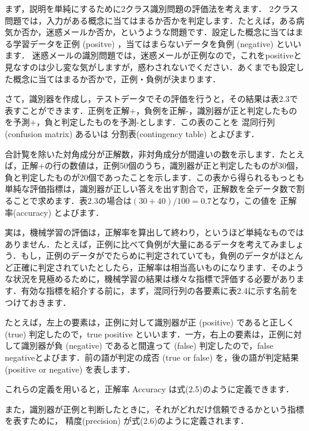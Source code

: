 
まず，説明を単純にするために2クラス識別問題の評価法を考えます．
2クラス問題では，入力がある概念に当てはまるか否かを判定します．たとえば，ある病気か否か，迷惑メールか否か，というような問題です．設定した概念に当てはまる学習データを正例 (positve) ，当てはまらないデータを負例 (negative) といいます．
迷惑メールの識別問題では，迷惑メールが正例なので，これをpositiveと見なすのは少し変な気がしますが，惑わされないでください．あくまでも設定した概念に当てはまるか否かで，正例・負例が決まります．

さて，識別器を作成し，テストデータでその評価を行うと，その結果は表2.3で表すことができます．正例を正解+，負例を正解-，識別器が正と判定したものを予測+，負と判定したものを予測-とします．この表のことを
混同行列(confusion matrix)
あるいは
分割表(contingency table)
とよびます．



合計覧を除いた対角成分が正解数，非対角成分が間違いの数を示します．たとえば，正解+の行の数値は，正例50個のうち，識別器が正と判定したものが30個，負と判定したものが20個であったことを示します．この表から得られるもっとも単純な評価指標は，識別器が正しい答えを出す割合で，正解数を全データ数で割ることで求めます．表2.3の場合は$(30+40)/100=0.7$となり，この値を
正解率(accuracy)
とよびます．


実は，機械学習の評価は，正解率を算出して終わり，というほど単純なものではありません．たとえば，正例に比べて負例が大量にあるデータを考えてみましょう．もし，正例のデータがでたらめに判定されていても，負例のデータがほとんど正確に判定されていたとしたら，正解率は相当高いものになります．そのような状況を見極めるために，機械学習の結果は様々な指標で評価する必要があります．有効な指標を紹介する前に，まず，混同行列の各要素に表2.4に示す名前をつけておきます．


たとえば，左上の要素は，正例に対して識別器が正 (positive) であると正しく (true) 判定したので，true positive といいます．一方，右上の要素は，正例に対して識別器が負 (negative) であると間違って (false) 判定したので，false negativeとよびます．前の語が判定の成否 (true or false) を，後の語が判定結果 (positive or negative) を表します．

これらの定義を用いると，正解率 Accuracy は式(2.5)のように定義できます．


また，識別器が正例と判断したときに，それがどれだけ信頼できるかという指標を表すために，
精度(precision)
が式(2.6)のように定義されます．

